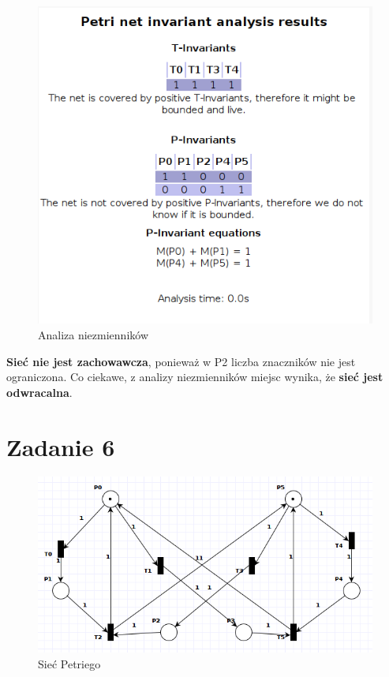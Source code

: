\documentclass[12pt,a4paper,table]{article}
\begin{document}
    \begin{figure}[H]
        \centering
        \includegraphics[width=0.6\linewidth]{img/zad5-2.png}
        \caption{Analiza niezmienników}
        \label{fig:zad5-2}
    \end{figure}

    \textbf{Sieć nie jest zachowawcza}, ponieważ w P2 liczba znaczników nie jest ograniczona.
    Co ciekawe, z analizy niezmienników miejsc wynika, że \textbf{sieć jest odwracalna}.

    \section{Zadanie 6}

    \begin{figure}[H]
        \centering
        \includegraphics[width=0.8\linewidth]{img/zad6-1.png}
        \caption{Sieć Petriego}
        \label{fig:zad6-1}
    \end{figure}
\end{document}
